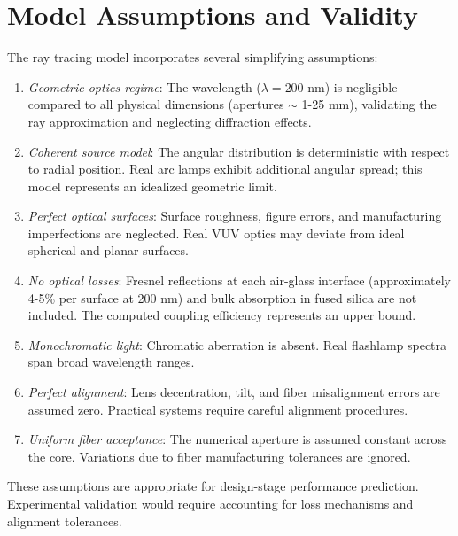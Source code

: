 \section{Model Assumptions and Validity}

The ray tracing model incorporates several simplifying assumptions:

\begin{enumerate}[leftmargin=*]
    \item \textit{Geometric optics regime}: The wavelength ($\lambda = 200$ nm) is negligible compared to all physical dimensions (apertures $\sim$ 1-25 mm), validating the ray approximation and neglecting diffraction effects.
    
    \item \textit{Coherent source model}: The angular distribution is deterministic with respect to radial position. Real arc lamps exhibit additional angular spread; this model represents an idealized geometric limit.
    
    \item \textit{Perfect optical surfaces}: Surface roughness, figure errors, and manufacturing imperfections are neglected. Real VUV optics may deviate from ideal spherical and planar surfaces.
    
    \item \textit{No optical losses}: Fresnel reflections at each air-glass interface (approximately 4-5\% per surface at 200 nm) and bulk absorption in fused silica are not included. The computed coupling efficiency represents an upper bound.
    
    \item \textit{Monochromatic light}: Chromatic aberration is absent. Real flashlamp spectra span broad wavelength ranges.
    
    \item \textit{Perfect alignment}: Lens decentration, tilt, and fiber misalignment errors are assumed zero. Practical systems require careful alignment procedures.
    
    \item \textit{Uniform fiber acceptance}: The numerical aperture is assumed constant across the core. Variations due to fiber manufacturing tolerances are ignored.
\end{enumerate}

These assumptions are appropriate for design-stage performance prediction. Experimental validation would require accounting for loss mechanisms and alignment tolerances.

